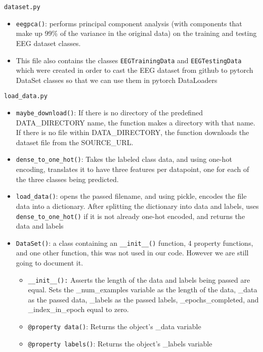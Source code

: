 \documentclass[]{report}
\begin{document}
\texttt{dataset.py}
\begin{itemize}
	\item \texttt{eegpca()}: performs principal component analysis (with components that make up 99\% of the variance in the original data) on the training and testing EEG dataset classes.
	
	\item This file also contains the classes \texttt{EEGTrainingData} and \texttt{EEGTestingData} which were created in order to cast the EEG dataset from github to pytorch DataSet classes so that we can use them in pytorch DataLoaders
\end{itemize}

\texttt{load\_data.py}
\begin{itemize}
	\item \texttt{maybe\_download()}: If there is no directory of the predefined DATA\_DIRECTORY name, the function makes a directory with that name. If there is no file within DATA\_DIRECTORY, the function downloads the dataset file from the SOURCE\_URL.
	
	\item \texttt{dense\_to\_one\_hot()}: Takes the labeled class data, and using one-hot encoding, translates it to have three features per datapoint, one for each of the three classes being predicted.
	
	\item \texttt{load\_data()}: opens the passed filename, and using pickle, encodes the file data into a dictionary. After splitting the dictionary into data and labels, uses \texttt{dense\_to\_one\_hot()} if it is not already one-hot encoded, and returns the data and labels
	
	\item \texttt{DataSet()}: a class containing an \texttt{\_\_init\_\_()} function, 4 property functions, and one other function, this was not used in our code. However we are still going to document it.
	\begin{itemize}[]
		\item \texttt{\_\_init\_\_():} Asserts the length of the data and labels being passed are equal. Sets the \_num\_examples variable as the length of the data, \_data as the passed data, \_labels as the passed labels, \_epochs\_completed, and \_index\_in\_epoch equal to zero.
		
		\item \texttt{@property data()}: Returns the object’s \_data variable
		
		\item \texttt{@property labels()}: Returns the object’s \_labels variable
		

\end{itemize}
\end{itemize}
\end{document}
